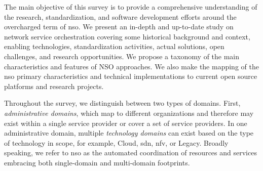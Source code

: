 The main objective of this survey is to provide a comprehensive understanding of the research, standardization, and software development efforts around the overcharged term of  \acrlong{nso}. We present an in-depth and up-to-date study on network service orchestration covering some historical background and context, enabling technologies, standardization activities, actual solutions, open challenges, and research opportunities. We propose a taxonomy of the main characteristics and features of NSO approaches. We also make the mapping of the \gls{nso} primary characteristics and technical implementations to current open source platforms and research projects.    

Throughout the survey, we distinguish between two types of domains. First, \textit{administrative domains}, which map to different organizations and therefore may exist within a single service provider or cover a set of service providers. In one administrative domain, multiple \textit{technology domains} can exist based on the type of technology in scope, for example, Cloud, \gls{sdn}, \gls{nfv}, or Legacy. 
Broadly speaking, we refer to \gls{nso} as the automated coordination of resources and services embracing both single-domain and multi-domain footprints.  

